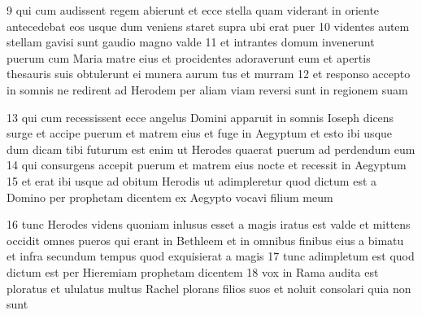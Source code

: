 9 qui cum audissent regem abierunt et ecce stella quam viderant in oriente antecedebat eos usque dum veniens staret supra ubi erat puer  10 videntes autem stellam gavisi sunt gaudio magno valde  11 et intrantes domum invenerunt puerum cum Maria matre eius et procidentes adoraverunt eum et apertis thesauris suis obtulerunt ei munera aurum tus et murram  12 et responso accepto in somnis ne redirent ad Herodem per aliam viam reversi sunt in regionem suam

13 qui cum recessissent ecce angelus Domini apparuit in somnis Ioseph dicens surge et accipe puerum et matrem eius et fuge in Aegyptum et esto ibi usque dum dicam tibi futurum est enim ut Herodes quaerat puerum ad perdendum eum  14 qui consurgens accepit puerum et matrem eius nocte et recessit in Aegyptum  15 et erat ibi usque ad obitum Herodis ut adimpleretur quod dictum est a Domino per prophetam dicentem ex Aegypto vocavi filium meum

16 tunc Herodes videns quoniam inlusus esset a magis iratus est valde et mittens occidit omnes pueros qui erant in Bethleem et in omnibus finibus eius a bimatu et infra secundum tempus quod exquisierat a magis  17 tunc adimpletum est quod dictum est per Hieremiam prophetam dicentem  18 vox in Rama audita est ploratus et ululatus multus Rachel plorans filios suos et noluit consolari quia non sunt

